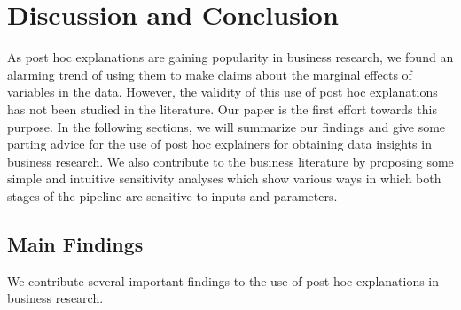 \documentclass[mnsc,blindrev]{informs3}
\begin{document}
\section{Discussion and Conclusion}
    \label{sec:discussion}
    As post hoc explanations are gaining popularity in business research, we found an alarming trend of using them to make claims about the marginal effects of variables in the data.  However, the validity of this use of post hoc explanations has not been studied in the literature. 
    Our paper is the first effort towards this purpose. 
     In the following sections, we will summarize our findings and give some parting advice for the use of post hoc explainers for obtaining data insights in business research. 
    We also contribute to the business literature by proposing some simple and intuitive sensitivity analyses which show various ways in which both stages of the pipeline are sensitive to inputs and parameters. 


    \subsection{Main Findings}
        We contribute several important findings to the use of post hoc explanations in business research.
\end{document}
